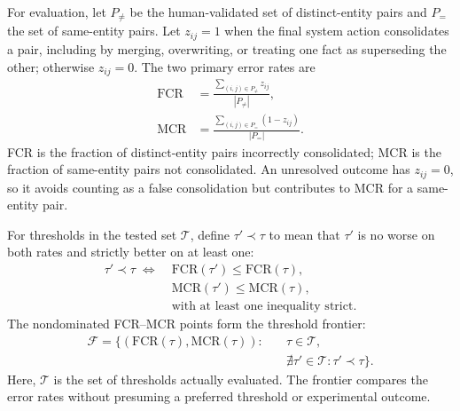 \documentclass[conference]{IEEEtran}
\begin{document}
For evaluation, let $P_{\ne}$ be the human-validated set of distinct-entity pairs and $P_{=}$ the set of same-entity pairs. Let $z_{ij}=1$ when the final system action consolidates a pair, including by merging, overwriting, or treating one fact as superseding the other; otherwise $z_{ij}=0$. The two primary error rates are
\begin{align}
    \mathrm{FCR} &= \frac{\sum_{(i,j)\in P_{\ne}} z_{ij}}{|P_{\ne}|},
    \label{app:eq:fcr}\\
    \mathrm{MCR} &= \frac{\sum_{(i,j)\in P_=} (1-z_{ij})}{|P_=|}.
    \label{app:eq:mcr}
\end{align}
FCR is the fraction of distinct-entity pairs incorrectly consolidated; MCR is the fraction of same-entity pairs not consolidated. An unresolved outcome has $z_{ij}=0$, so it avoids counting as a false consolidation but contributes to MCR for a same-entity pair.

For thresholds in the tested set $\mathcal{T}$, define $\tau' \prec \tau$ to mean that $\tau'$ is no worse on both rates and strictly better on at least one:
\begin{equation}
\begin{aligned}
    \tau' \prec \tau \;\Longleftrightarrow\;&
    \mathrm{FCR}(\tau') \le \mathrm{FCR}(\tau),\\
    &\mathrm{MCR}(\tau') \le \mathrm{MCR}(\tau),\\
    &\text{with at least one inequality strict}.
\end{aligned}
    \label{app:eq:dominance}
\end{equation}
The nondominated FCR--MCR points form the threshold frontier:
\begin{equation}
\begin{aligned}
    \mathcal{F} = \{(\mathrm{FCR}(\tau),\mathrm{MCR}(\tau)) :\quad
        &\tau\in\mathcal{T},\\
        &\nexists\tau'\in\mathcal{T}:\tau'\prec\tau\}.
\end{aligned}
    \label{app:eq:frontier}
\end{equation}
Here, $\mathcal{T}$ is the set of thresholds actually evaluated. The frontier compares the error rates without presuming a preferred threshold or experimental outcome.
\end{document}

